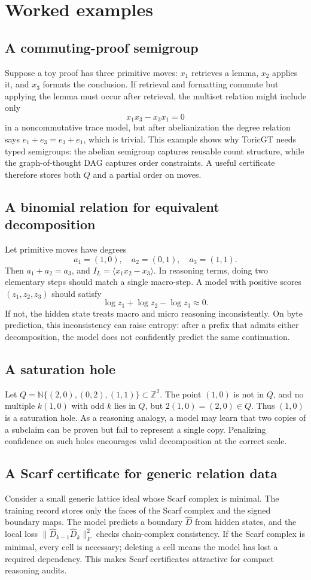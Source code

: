 \documentclass[11pt]{article}
\theoremstyle{definition}
\newcommand{\NN}{\mathbb{N}}
\newcommand{\ZZ}{\mathbb{Z}}
\begin{document}
\section{Worked examples}
\subsection{A commuting-proof semigroup}
Suppose a toy proof has three primitive moves: \(x_1\) retrieves a lemma, \(x_2\) applies it, and \(x_3\) formats the conclusion.  If retrieval and formatting commute but applying the lemma must occur after retrieval, the multiset relation might include only
\[
x_1x_3-x_3x_1=0
\]
in a noncommutative trace model, but after abelianization the degree relation says \(e_1+e_3=e_3+e_1\), which is trivial.  This example shows why ToricGT needs typed semigroups: the abelian semigroup captures reusable count structure, while the graph-of-thought DAG captures order constraints.  A useful certificate therefore stores both \(Q\) and a partial order on moves.

\subsection{A binomial relation for equivalent decomposition}
Let primitive moves have degrees
\[
a_1=(1,0),\quad a_2=(0,1),\quad a_3=(1,1).
\]
Then \(a_1+a_2=a_3\), and \(I_L=\langle x_1x_2-x_3\rangle\).  In reasoning terms, doing two elementary steps should match a single macro-step.  A model with positive scores \((z_1,z_2,z_3)\) should satisfy
\[
\log z_1+\log z_2-\log z_3\approx 0.
\]
If not, the hidden state treats macro and micro reasoning inconsistently.  On byte prediction, this inconsistency can raise entropy: after a prefix that admits either decomposition, the model does not confidently predict the same continuation.

\subsection{A saturation hole}
Let \(Q=\NN\{(2,0),(0,2),(1,1)\}\subset\ZZ^2\).  The point \((1,0)\) is not in \(Q\), and no multiple \(k(1,0)\) with odd \(k\) lies in \(Q\), but \(2(1,0)=(2,0)\in Q\).  Thus \((1,0)\) is a saturation hole.  As a reasoning analogy, a model may learn that two copies of a subclaim can be proven but fail to represent a single copy.  Penalizing confidence on such holes encourages valid decomposition at the correct scale.

\subsection{A Scarf certificate for generic relation data}
Consider a small generic lattice ideal whose Scarf complex is minimal.  The training record stores only the faces of the Scarf complex and the signed boundary maps.  The model predicts a boundary \(\hat D\) from hidden states, and the local loss \(\|\hat D_{k-1}\hat D_k\|_F^2\) checks chain-complex consistency.  If the Scarf complex is minimal, every cell is necessary; deleting a cell means the model has lost a required dependency.  This makes Scarf certificates attractive for compact reasoning audits.
\end{document}
